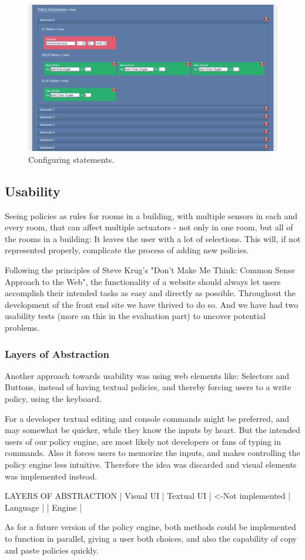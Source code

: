 \begin{figure}[h!]
\centering
\includegraphics[width=\columnwidth]{statement.png}
\caption{Configuring statements.}
\label{fig:statement}
\end{figure}


\subsection{Usability}
Seeing policies as rules for rooms in a building, with multiple sensors in each and every room, that can affect multiple actuators - not only in one room, but all of the rooms in a building: It leaves the user with a lot of selections. 
This will, if not represented properly, complicate the process of adding new policies.

Following the principles of Steve Krug's "Don't Make Me Think: Common Sense Approach to the Web"\cite{Krug:2005:DMM:1051204}, the functionality of a website should always let users accomplish their intended tasks as easy and directly as possible.
Throughout the development of the front end site we have thrived to do so. And we have had two usability tests (more on this in the evaluation part) to uncover potential problems.

\subsubsection{Layers of Abstraction}
Another approach towards usability was using web elements like: Selectors and Buttons, instead of having textual policies, and thereby forcing users to a write policy, using the keyboard.

For a developer textual editing and console commands might be preferred, and may somewhat be quicker, while they know the inputs by heart. But the intended users of our policy engine, are most likely not developers or fans of typing in commands.
Also it forces users to memorize the inputs, and makes controlling the policy engine less intuitive. Therefore the idea was discarded and visual elements was implemented instead.


LAYERS OF ABSTRACTION
| Visual UI | Textual UI | <-Not implemented
| Language |
| Engine |

As for a future version of the policy engine, both methods could be implemented to function in parallel, giving a user both choices, and also the capability of copy and paste policies quickly.
